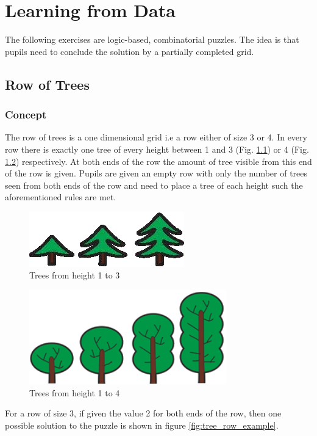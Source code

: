 \chapter{Learning from Data}
\label{chapter:learningFromData}

The following exercises are logic-based, combinatorial puzzles. The idea is that pupils need to conclude the solution by a partially completed grid.

\section{Row of Trees}
\label{section:treeRow}

\subsection{Concept}
The row of trees is a one dimensional grid i.e a row either of size 3 or 4. In every row there is exactly one tree of every height between 1 and 3 (Fig. \ref{fig:trees_3}) or 4 (Fig. \ref{fig:trees_4}) respectively. At both ends of the row the amount of tree visible from this end of the row is given.
Pupils are given an empty row with only the number of trees seen from both ends of the row and need to place a tree of each height such the aforementioned rules are met.

\begin{figure} 
    \centering
    \includegraphics[width=0.4 \columnwidth]{figures/trees_3.png}
    \caption{Trees from height 1 to 3} 
    \label{fig:trees_3} 
\end{figure}

\begin{figure} 
    \centering
    \includegraphics[width=0.4 \columnwidth]{figures/trees_4.png}
    \caption{Trees from height 1 to 4} 
    \label{fig:trees_4} 
\end{figure}

\begin{example}
    For a row of size 3, if given the value 2 for both ends of the row, then one possible solution to the puzzle is shown in figure \ref{fig:tree_row_example}.
\end{example}

